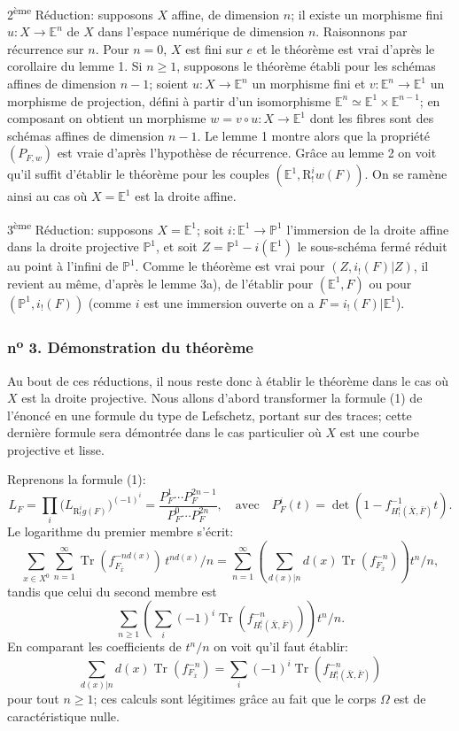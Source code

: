 \documentclass[11pt]{article}
\newcommand{\R}{\mathrm{R}}\newcommand{\RHomCore}{\mathrm{RHom}}
\providecommand{\Tr}{\operatorname{Tr}}
\providecommand{\Tr}{\operatorname{Tr}}
\providecommand{\Tr}{\operatorname{Tr}}
\providecommand{\R}{\mathrm R}
\providecommand{\Tr}{\operatorname{Tr}}
\providecommand{\Tr}{\operatorname{Tr}}
\begin{document}
2\textsuperscript{ème} Réduction: supposons $X$ affine, de dimension $n$; il existe un morphisme fini $u:X\to\mathbb E^n$ de $X$ dans l'espace numérique de dimension $n$. Raisonnons par récurrence sur $n$. Pour $n=0$, $X$ est fini sur $e$ et le théorème est vrai d'après le corollaire du lemme 1. Si $n\ge1$, supposons le théorème établi pour les schémas affines de dimension $n-1$; soient $u:X\to\mathbb E^n$ un morphisme fini et $v:\mathbb E^n\to\mathbb E^1$ un morphisme de projection, défini à partir d'un isomorphisme $\mathbb E^n\simeq\mathbb E^1\times\mathbb E^{n-1}$; en composant on obtient un morphisme $w=v\circ u:X\to\mathbb E^1$ dont les fibres sont des schémas affines de dimension $n-1$. Le lemme 1 montre alors que la propriété $(P_{F,w})$ est vraie d'après l'hypothèse de récurrence. Grâce au lemme 2 on voit qu'il suffit d'établir le théorème pour les couples $(\mathbb E^1,\R^i_!w(F))$. On se ramène ainsi au cas où $X=\mathbb E^1$ est la droite affine.

3\textsuperscript{ème} Réduction: supposons $X=\mathbb E^1$; soit $i:\mathbb E^1\to\mathbb P^1$ l'immersion de la droite affine dans la droite projective $\mathbb P^1$, et soit $Z=\mathbb P^1-i(\mathbb E^1)$ le sous-schéma fermé réduit au point à l'infini de $\mathbb P^1$. Comme le théorème est vrai pour $(Z,i_!(F)|Z)$, il revient au même, d'après le lemme 3a), de l'établir pour $(\mathbb E^1,F)$ ou pour $(\mathbb P^1,i_!(F))$ (comme $i$ est une immersion ouverte on a $F=i_!(F)|\mathbb E^1$).

\subsubsection*{n\textsuperscript{o} 3. Démonstration du théorème}

Au bout de ces réductions, il nous reste donc à établir le théorème dans le cas où $X$ est la droite projective. Nous allons d'abord transformer la formule (1) de l'énoncé en une formule du type de Lefschetz, portant sur des traces; cette dernière formule sera démontrée dans le cas particulier où $X$ est une courbe projective et lisse.

Reprenons la formule (1):
\[
L_F=\prod_i\bigl(L_{\R^i_!g(F)}\bigr)^{(-1)^i}
=\frac{P_F^1\cdots P_F^{2n-1}}{P_F^0\cdots P_F^{2n}},
\quad\text{avec}\quad
P_F^i(t)=\det(1-f^{-1}_{H^i_!(\bar X,\bar F)}t).
\]
Le logarithme du premier membre s'écrit:
\[
\sum_{x\in X^0}\sum_{n=1}^{\infty}\Tr(f_{F_{\bar x}}^{-n d(x)})\,t^{n d(x)}/n
=\sum_{n=1}^{\infty}\left(\sum_{d(x)|n} d(x)\Tr(f_{F_{\bar x}}^{-n})\right)t^n/n,
\]
tandis que celui du second membre est
\[
\sum_{n\ge1}\left(\sum_i(-1)^i\Tr(f^{-n}_{H^i_!(\bar X,\bar F)})\right)t^n/n.
\]
En comparant les coefficients de $t^n/n$ on voit qu'il faut établir:
\[
\sum_{d(x)|n}d(x)\Tr(f_{F_{\bar x}}^{-n})
=\sum_i(-1)^i\Tr(f^{-n}_{H^i_!(\bar X,\bar F)})
\tag{2}
\]
pour tout $n\ge1$; ces calculs sont légitimes grâce au fait que le corps $\Omega$ est de caractéristique nulle.
\end{document}
